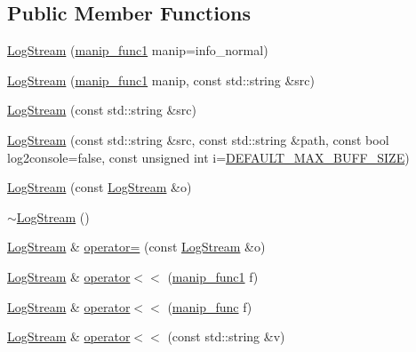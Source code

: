 \subsection*{Public Member Functions}
\begin{DoxyCompactItemize}
\item 
\hyperlink{classkisscpp_1_1_log_stream_a8244d37bf4c6672cfc0351b3f294a54f}{Log\-Stream} (\hyperlink{classkisscpp_1_1_log_stream_ab6994c757d4c63c4388a932cf2be2c9d}{manip\-\_\-func1} manip=info\-\_\-normal)
\item 
\hyperlink{classkisscpp_1_1_log_stream_a0930cbb1c090d6b8fc8b102286c9b926}{Log\-Stream} (\hyperlink{classkisscpp_1_1_log_stream_ab6994c757d4c63c4388a932cf2be2c9d}{manip\-\_\-func1} manip, const std\-::string \&src)
\item 
\hyperlink{classkisscpp_1_1_log_stream_a69ca636671642a5340a270e4f22acfaa}{Log\-Stream} (const std\-::string \&src)
\item 
\hyperlink{classkisscpp_1_1_log_stream_a6fd5fd45724810d833db3ce5b0c6d8c4}{Log\-Stream} (const std\-::string \&src, const std\-::string \&path, const bool log2console=false, const unsigned int i=\hyperlink{logstream_8hpp_a4ea9e3032a294c731fcfa3401f82ea98}{D\-E\-F\-A\-U\-L\-T\-\_\-\-M\-A\-X\-\_\-\-B\-U\-F\-F\-\_\-\-S\-I\-Z\-E})
\item 
\hyperlink{classkisscpp_1_1_log_stream_a76dbd7329fb9089fff830a650535085e}{Log\-Stream} (const \hyperlink{classkisscpp_1_1_log_stream}{Log\-Stream} \&o)
\item 
\hyperlink{classkisscpp_1_1_log_stream_ae2b779d35193c4eb8dbefd4c0ae5e51b}{$\sim$\-Log\-Stream} ()
\item 
\hyperlink{classkisscpp_1_1_log_stream}{Log\-Stream} \& \hyperlink{classkisscpp_1_1_log_stream_a36c0df879f5c8aad154c7989cacf72c3}{operator=} (const \hyperlink{classkisscpp_1_1_log_stream}{Log\-Stream} \&o)
\item 
\hyperlink{classkisscpp_1_1_log_stream}{Log\-Stream} \& \hyperlink{classkisscpp_1_1_log_stream_a8c5790a046e735254faa31ac5e5be57a}{operator$<$$<$} (\hyperlink{classkisscpp_1_1_log_stream_ab6994c757d4c63c4388a932cf2be2c9d}{manip\-\_\-func1} f)
\item 
\hyperlink{classkisscpp_1_1_log_stream}{Log\-Stream} \& \hyperlink{classkisscpp_1_1_log_stream_a0e172406664a3f1b6da344675795ee22}{operator$<$$<$} (\hyperlink{classkisscpp_1_1_log_stream_abb058ef2b1b57fb7e0b89c3312794ada}{manip\-\_\-func} f)
\item 
\hyperlink{classkisscpp_1_1_log_stream}{Log\-Stream} \& \hyperlink{classkisscpp_1_1_log_stream_a02180d2e0d8f61c26e0b68912f0508c0}{operator$<$$<$} (const std\-::string \&v)

\end{DoxyCompactItemize}
